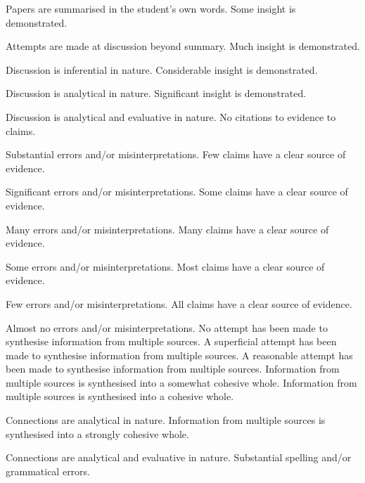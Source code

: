 \documentclass{../../fal_assignment}
\begin{document}
\begin{markingrubric}
        \par		Papers are summarised in the student's own words.
        \grade		Some insight is demonstrated.
        \par		Attempts are made at discussion beyond summary.
        \grade		Much insight is demonstrated.
        \par		Discussion is inferential in nature.
        \grade		Considerable insight is demonstrated.
        \par		Discussion is analytical in nature.
        \grade		Significant insight is demonstrated.
        \par		Discussion is analytical and evaluative in nature.
%
        \grade\fail 	No citations to evidence to claims.
        \par 		Substantial errors and/or misinterpretations.
        \grade 		Few claims have a clear source of evidence.
        \par 		Significant errors and/or misinterpretations.
        \grade 		Some claims have a clear source of evidence.
        \par 		Many errors and/or misinterpretations.
        \grade 		Many claims have a clear source of evidence.
        \par 		Some errors and/or misinterpretations.
        \grade 		Most claims have a clear source of evidence.
        \par 		Few errors and/or misinterpretations.
        \grade 		All claims have a clear source of evidence.
        \par 		Almost no errors and/or misinterpretations.
%
        \grade\fail No attempt has been made to synthesise information from multiple sources.
        \grade		A superficial attempt has been made to synthesise information from multiple sources.
        \grade		A reasonable attempt has been made to synthesise information from multiple sources.
        \grade		Information from multiple sources is synthesised into a somewhat cohesive whole.
        \grade		Information from multiple sources is synthesised into a cohesive whole.
        \par		Connections are analytical in nature.
        \grade		Information from multiple sources is synthesised into a strongly cohesive whole.
        \par		Connections are analytical and evaluative in nature.
%
        \grade\fail 	Substantial spelling and/or grammatical errors.

\end{markingrubric}
\end{document}
